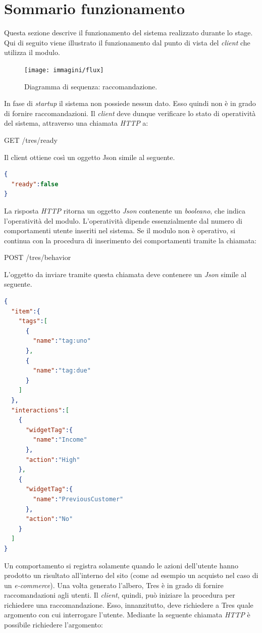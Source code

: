 \section{Sommario funzionamento}
Questa sezione descrive il funzionamento del sistema realizzato durante lo stage. Qui di seguito viene illustrato il funzionamento dal punto di vista del \emph{client} che utilizza il modulo.
\begin{figure}[h]
\centering
\texttt{[image: immagini/flux]}
\caption{Diagramma di sequenza: raccomandazione.}
\label{fig:flux}
\end{figure}
\newpage
In fase di \emph{startup} il sistema non possiede nessun dato. Esso quindi non è in grado di fornire raccomandazioni. Il \emph{client} deve dunque verificare lo stato di operatività del sistema, attraverso una chiamata \emph{HTTP} a:\\
\begin{center}
GET    /tres/ready
\end{center}
Il client ottiene così un oggetto Json simile al seguente.
\begin{lstlisting}[language=json,firstnumber=1]
{
  "ready":false
}
\end{lstlisting}
La risposta \emph{HTTP} ritorna un oggetto \emph{Json} contenente un \emph{booleano}, che indica l'operatività del modulo. L'operatività dipende essenzialmente dal numero di comportamenti utente inseriti nel sistema. Se il modulo non è operativo, si continua con la procedura di inserimento dei comportamenti tramite la chiamata:
\begin{center}
POST    /tres/behavior
\end{center}
L'oggetto da inviare tramite questa chiamata deve contenere un \emph{Json} simile al seguente.
\begin{lstlisting}[language=json,firstnumber=1]
{
  "item":{
    "tags":[
      {
        "name":"tag:uno"
      },
      {
        "name":"tag:due"
      }
    ]
  },
  "interactions":[
    {
      "widgetTag":{
        "name":"Income"
      },
      "action":"High"
    },
    {
      "widgetTag":{
        "name":"PreviousCustomer"
      },
      "action":"No"
    }
  ]
}
\end{lstlisting}
Un comportamento si registra solamente quando le azioni dell'utente hanno prodotto un risultato all'interno del sito (come ad esempio un acquisto nel caso di un \emph{e-commerce}). Una volta generato l'albero, Tres è in grado di fornire raccomandazioni agli utenti. Il \emph{client}, quindi, può iniziare la procedura per richiedere una raccomandazione. Esso, innanzitutto, deve richiedere a Tres quale argomento con cui interrogare l'utente. Mediante la seguente chiamata \emph{HTTP} è possibile richiedere l'argomento: 
